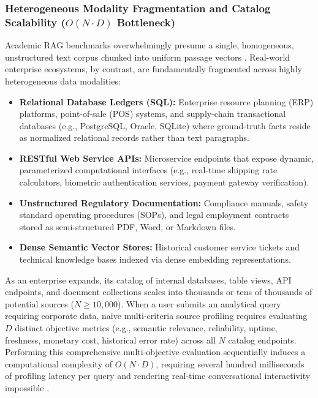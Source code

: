 \documentclass[journal,10pt,twocolumn]{IEEEtran}
\begin{document}
\subsubsection{Heterogeneous Modality Fragmentation and Catalog Scalability ($O(N \cdot D)$ Bottleneck)}
Academic RAG benchmarks overwhelmingly presume a single, homogeneous, unstructured text corpus chunked into uniform passage vectors \cite{thakur2021beir}. Real-world enterprise ecosystems, by contrast, are fundamentally fragmented across highly heterogeneous data modalities:
\begin{itemize}
    \item \textbf{Relational Database Ledgers (SQL):} Enterprise resource planning (ERP) platforms, point-of-sale (POS) systems, and supply-chain transactional databases (e.g., PostgreSQL, Oracle, SQLite) where ground-truth facts reside as normalized relational records rather than text paragraphs.
    \item \textbf{RESTful Web Service APIs:} Microservice endpoints that expose dynamic, parameterized computational interfaces (e.g., real-time shipping rate calculators, biometric authentication services, payment gateway verification).
    \item \textbf{Unstructured Regulatory Documentation:} Compliance manuals, safety standard operating procedures (SOPs), and legal employment contracts stored as semi-structured PDF, Word, or Markdown files.
    \item \textbf{Dense Semantic Vector Stores:} Historical customer service tickets and technical knowledge bases indexed via dense embedding representations.
\end{itemize}

As an enterprise expands, its catalog of internal databases, table views, API endpoints, and document collections scales into thousands or tens of thousands of potential sources ($N \ge 10,000$). When a user submits an analytical query requiring corporate data, naive multi-criteria source profiling requires evaluating $D$ distinct objective metrics (e.g., semantic relevance, reliability, uptime, freshness, monetary cost, historical error rate) across all $N$ catalog endpoints. Performing this comprehensive multi-objective evaluation sequentially induces a computational complexity of $O(N \cdot D)$, requiring several hundred milliseconds of profiling latency per query and rendering real-time conversational interactivity impossible \cite{qin2023toolllm,patil2023gorilla}.
\end{document}
